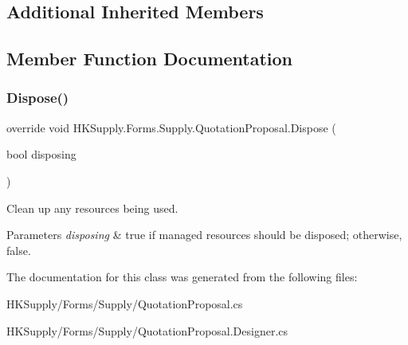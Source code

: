 \subsection*{Additional Inherited Members}


\subsection{Member Function Documentation}
\mbox{\label{class_h_k_supply_1_1_forms_1_1_supply_1_1_quotation_proposal_a0f33f4fea55f3aeaced58d29f0005019}} 
\subsubsection{\texorpdfstring{Dispose()}{Dispose()}}
{\footnotesize\ttfamily override void H\+K\+Supply.\+Forms.\+Supply.\+Quotation\+Proposal.\+Dispose (\begin{DoxyParamCaption}\item[{bool}]{disposing }\end{DoxyParamCaption})\hspace{0.3cm}{\ttfamily [protected]}}



Clean up any resources being used. 


\begin{DoxyParams}{Parameters}
{\em disposing} & true if managed resources should be disposed; otherwise, false.\\
\hline
\end{DoxyParams}


The documentation for this class was generated from the following files\+:\begin{DoxyCompactItemize}
\item 
H\+K\+Supply/\+Forms/\+Supply/Quotation\+Proposal.\+cs\item 
H\+K\+Supply/\+Forms/\+Supply/Quotation\+Proposal.\+Designer.\+cs\end{DoxyCompactItemize}
